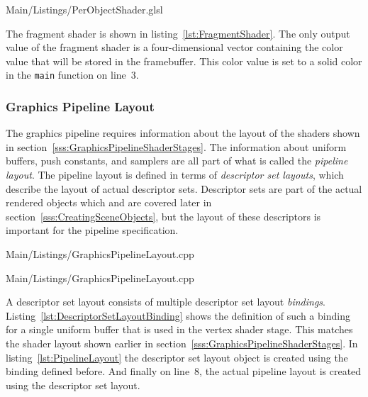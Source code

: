         
        {Main/Listings/PerObjectShader.glsl}

        The fragment shader is shown in listing~\ref{lst:FragmentShader}.
        The only output value of the fragment shader is a four-dimensional vector containing the color value that will be stored in the framebuffer.
        This color value is set to a solid color in the \lstinline{main} function on line~3.

      \subsubsection{Graphics Pipeline Layout}
      \label{sss:GraphicsPipelineLayout}
        The graphics pipeline requires information about the layout of the shaders shown in section~\ref{sss:GraphicsPipelineShaderStages}.
        The information about uniform buffers, push constants, and samplers are all part of what is called the \textit{pipeline layout}.
        The pipeline layout is defined in terms of \textit{descriptor set layouts}, which describe the layout of actual descriptor sets.
        Descriptor sets are part of the actual rendered objects which and are covered later in section~\ref{sss:CreatingSceneObjects}, but the layout of these descriptors is important for the pipeline specification.

        
        {Main/Listings/GraphicsPipelineLayout.cpp}

        
        {Main/Listings/GraphicsPipelineLayout.cpp}

        A descriptor set layout consists of multiple descriptor set layout \textit{bindings}.
        Listing~\ref{lst:DescriptorSetLayoutBinding} shows the definition of such a binding for a single uniform buffer that is used in the vertex shader stage.
        This matches the shader layout shown earlier in section~\ref{sss:GraphicsPipelineShaderStages}.
        In listing~\ref{lst:PipelineLayout} the descriptor set layout object is created using the binding defined before.
        And finally on line~8, the actual pipeline layout is created using the descriptor set layout.

